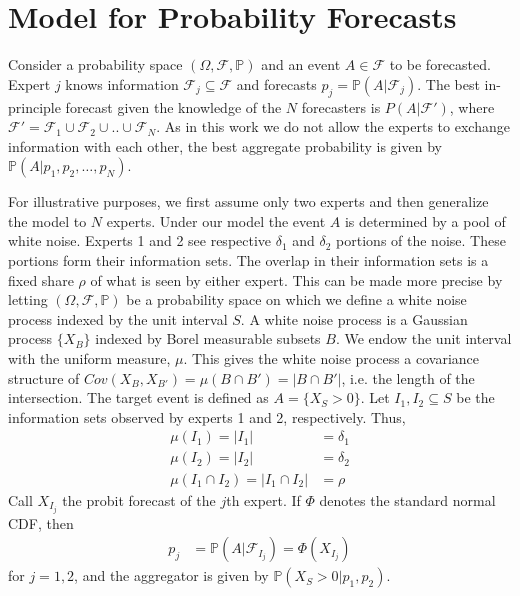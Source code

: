 \documentclass[11pt,twoside]{article}
\renewcommand{\P}{\mathbb{P}}
\begin{document}
\section{Model for Probability Forecasts}
\label{Model}
Consider a probability space $(\Omega, \mathcal{F}, \P)$ and an event $A \in \mathcal{F}$ to be forecasted. Expert $j$ knows information $\mathcal{F}_j \subseteq \mathcal{F}$ and forecasts $p_j = \P(A | \mathcal{F}_j)$. The best in-principle forecast given the knowledge of the $N$ forecasters is $P(A | \mathcal{F}')$, where $\mathcal{F}' = \mathcal{F}_1 \cup \mathcal{F}_2 \cup .. \cup \mathcal{F}_N$. As in this work we do not allow the experts to exchange information with each other, the best aggregate probability is given by $\P(A | p_1, p_2, \dots, p_N)$.

For illustrative purposes, we first assume only two experts and then generalize the model to $N$ experts. Under our model the event $A$ is determined by a pool of white noise. Experts 1 and 2 see respective $\delta_1$ and $\delta_2$ portions of the noise. These portions form their information sets. The overlap in their information sets is a fixed share $\rho$ of what is seen by either expert. This can be made more precise by letting  $(\Omega, \mathcal{F}, \P)$ be a probability space on which we define a white noise process indexed by the unit interval $S$. A white noise process is a Gaussian process $\{ X_B \}$ indexed by Borel measurable subsets $B$. We endow the unit interval with the uniform measure, $\mu$. This gives the white noise process a covariance structure of $Cov(X_B, X_{B'}) = \mu(B \cap B') = |B \cap B'|$, i.e. the length of the intersection. The target event is defined as $A = \{ X_{S} > 0\}$. Let $I_1, I_2 \subseteq S$ be the information sets observed by experts 1 and 2, respectively. Thus,
\begin{align*}
\mu(I_1) = |I_1| &= \delta_1\\
\mu(I_2) = |I_2| &= \delta_2\\
\mu(I_1 \cap I_2) =  |I_1 \cap I_2| &= \rho
\end{align*}
Call $X_{I_j}$ the probit forecast of the $j$th expert.  If $\Phi$ denotes the standard normal CDF, then
\begin{align*}
p_j &= \P(A | \mathcal{F}_{I_j}) = \Phi(X_{I_j})
\end{align*}
for $j = 1, 2$, and the aggregator is given by $\P(X_{S} > 0 | p_1, p_2)$.
\end{document}
